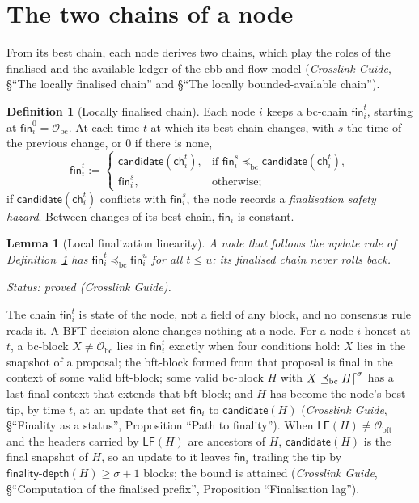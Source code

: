 \documentclass[11pt,a4paper]{article}
\newtheorem{lemma}[theorem]{Lemma}
\theoremstyle{definition}
\newtheorem{definition}[theorem]{Definition}
\newcommand{\bc}{\mathrm{bc}}
\newcommand{\bft}{\mathrm{bft}}
\newcommand{\Origin}{\mathcal{O}}
\newcommand{\Obc}{\Origin_{\bc}}
\newcommand{\Obft}{\Origin_{\bft}}
\newcommand{\preceqbc}{\preceq_{\bc}}
\newcommand{\ch}{\mathsf{ch}}
\newcommand{\LF}{\mathsf{LF}}
\newcommand{\candidate}{\mathsf{candidate}}
\newcommand{\finalitydepth}{\mathsf{finality\text{-}depth}}
\newcommand{\fin}{\mathsf{fin}}
\begin{document}
\section{The two chains of a node}\label{sec:ledgers}

From its best chain, each node derives two chains, which play the roles of
the finalised and the available ledger of the ebb-and-flow model
(\emph{Crosslink Guide}, \S``The locally finalised chain'' and \S``The
locally bounded-available chain'').

\begin{definition}[Locally finalised chain]\label{def:fin}
Each node $i$ keeps a bc-chain $\fin_i^t$, starting at $\fin_i^0 = \Obc$. At
each time $t$ at which its best chain changes, with $s$ the time of the
previous change, or $0$ if there is none,
\[
  \fin_i^t :=
  \begin{cases}
    \candidate(\ch_i^t), & \text{if } \fin_i^s \preceqbc
      \candidate(\ch_i^t),\\
    \fin_i^s, & \text{otherwise};
  \end{cases}
\]
if $\candidate(\ch_i^t)$ conflicts with $\fin_i^s$, the node records a
\emph{finalisation safety hazard}. Between changes of its best chain,
$\fin_i$ is constant.
\end{definition}

\begin{lemma}[Local finalization linearity]\label{lem:fin-linear}
A node that follows the update rule of Definition~\ref{def:fin} has
$\fin_i^t \preceqbc \fin_i^u$ for all $t \le u$: its finalised chain never
rolls back.

Status: proved (Crosslink Guide).
\end{lemma}

The chain $\fin_i^t$ is state of the node, not a field of any block, and no
consensus rule reads it. A BFT decision alone changes nothing at a node. For
a node $i$ honest at $t$, a bc-block $X \neq \Obc$ lies in $\fin_i^t$ exactly
when four conditions hold: $X$ lies in the snapshot of a proposal; the
bft-block formed from that proposal is final in the context of some valid
bft-block; some valid bc-block $H$ with $X \preceqbc H\trunc{\sigma}$ has a
last final context that extends that bft-block; and $H$ has become the
node's best tip, by time $t$, at an update that set $\fin_i$ to
$\candidate(H)$ (\emph{Crosslink Guide}, \S``Finality as a status'',
Proposition ``Path to finality''). When $\LF(H) \neq \Obft$ and the headers
carried by $\LF(H)$ are ancestors of $H$, $\candidate(H)$ is the final
snapshot of $H$, so an update
to it leaves $\fin_i$ trailing the tip by $\finalitydepth(H) \ge \sigma + 1$
blocks; the bound is attained (\emph{Crosslink Guide}, \S``Computation of
the finalised prefix'', Proposition ``Finalisation lag'').
\end{document}
